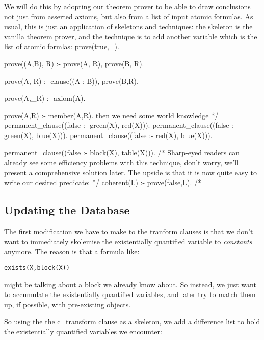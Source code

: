 \documentclass{book}[9pt]
\newenvironment{code}%
{\small \verbatim}%
{\endverbatim \large}
\begin{document}
We will do this by adopting our theorem prover to be able to draw conclusions
not just from asserted axioms, but also from a list of input atomic formulas.
As usual, this is just an application of skeletons and techniques: the
skeleton is the vanilla theorem prover, and the technique is to add another
variable which is the list of atomic formlas:
\begin{code} 
prove(true,_).

prove((A,B), R) :- prove(A, R), prove(B, R).

prove(A, R) :-
    clause((A :-B)),
    prove(B,R).

prove(A,_R) :- axiom(A).

prove(A,R) :- member(A,R).
\end{code}
\noindent then we need some world knowledge 
\begin{code}
*/
permanent_clause((false :- green(X), red(X))).
permanent_clause((false :- green(X), blue(X))).
permanent_clause((false :- red(X), blue(X))).

permanent_clause((false :- block(X), table(X))).
/*
\end{code}
\noindent Sharp-eyed readers can already see some efficiency problems
with this technique, don't worry, we'll present a comprehensive
solution later.  The upside is that it is now quite easy to write our
desired predicate:
\begin{code}
*/
coherent(L) :- \+ prove(false,L).
/*
\end{code}

\subsection{Updating the Database}

The first modification we have to make to the tranform clauses is that we
don't want to immediately skolemise the existentially quantified variable to
{\em constants} anymore.  The reason is that a formula like:
\begin{verbatim}
exists(X,block(X))
\end{verbatim}
\noindent might be talking about a block we already know about.  So instead,
we just want to accumulate the existentially quantified variables, and later
try to match them up, if possible, with pre-existing objects.

So using the the c\_transform clause as a skeleton, we add a difference list
to hold the existentially quantified variables we encounter:
\end{document}
